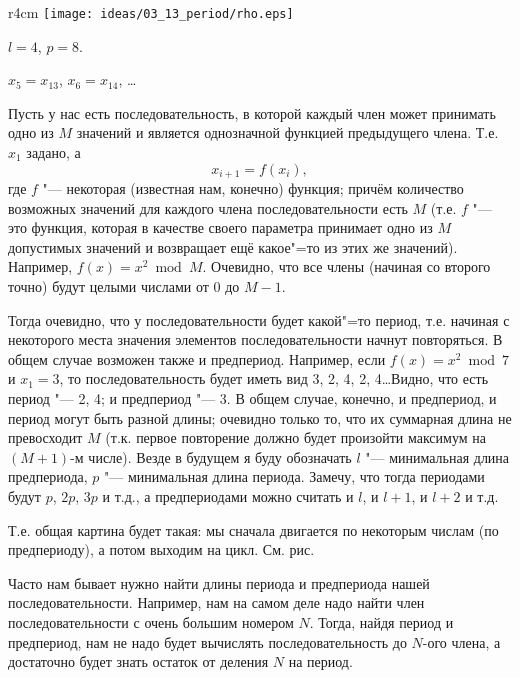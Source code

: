 


\begin{wrapfigure}{r}{4cm}
\texttt{[image: ideas/03\_13\_period/rho.eps]}
\begin{center}
\footnotesize
$l=4$, $p=8$.

$x_5=x_{13}$, $x_6=x_{14}$, \dots
\end{center}
\end{wrapfigure}


Пусть у нас есть последовательность, в которой каждый член может принимать одно из $M$ 
значений и является однозначной функцией предыдущего члена. Т.е. $x_1$ задано, а
$$
x_{i+1}=f(x_i),
$$
где $f$ "--- некоторая (известная нам, конечно) функция; причём количество возможных значений 
для каждого члена последовательности есть $M$ (т.е. $f$ "--- это функция, которая в качестве 
своего параметра принимает одно из $M$ допустимых значений и возвращает ещё какое"=то из этих 
же значений). Например, $f(x)=x^2 \bmod M$. Очевидно, что все члены (начиная со второго 
точно) будут целыми числами от 0 до $M-1$.

Тогда очевидно, что у последовательности будет какой"=то период, т.е. начиная с некоторого 
места значения элементов последовательности начнут повторяться. В общем случае возможен также 
и предпериод. Например, если $f(x)=x^2 \bmod 7$ и $x_1=3$, то последовательность будет иметь 
вид 3, 2, 4, 2, 4\dots Видно, что есть период "--- 2, 4; и предпериод "--- 3. В общем случае, 
конечно, и предпериод, и период могут быть разной длины; очевидно только то, что их суммарная 
длина не превосходит $M$ (т.к. первое повторение должно будет произойти максимум на $(M+1)$-м 
числе). Везде в будущем я буду обозначать $l$ "--- минимальная длина предпериода, $p$ "--- 
минимальная длина периода. Замечу, что тогда периодами будут $p$, $2p$, $3p$ и т.д., а 
предпериодами можно считать и $l$, и $l+1$, и $l+2$ и т.д.

Т.е. общая картина будет такая: мы сначала двигается по некоторым числам (по предпериоду), а 
потом выходим на цикл. См. рис.

Часто нам бывает нужно найти длины периода и предпериода нашей последовательности. Например, 
нам на самом деле надо найти член последовательности с очень большим номером $N$. Тогда, найдя
период и предпериод, нам не надо будет вычислять последовательность до $N$-ого члена, а 
достаточно будет знать остаток от деления $N$ на период.

